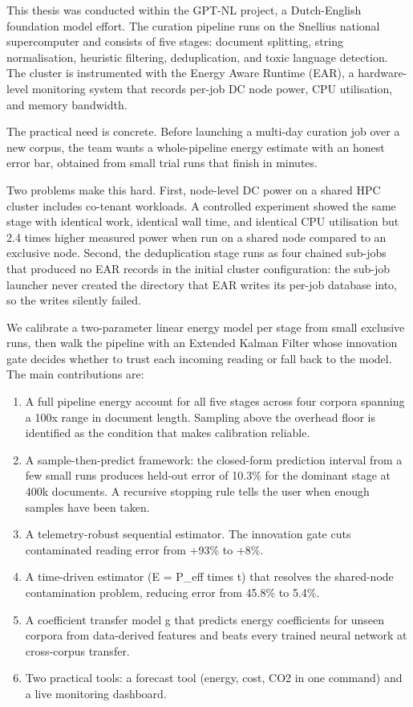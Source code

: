 \documentclass[12pt,a4paper]{article}
\begin{document}
This thesis was conducted within the GPT-NL project, a Dutch-English foundation model effort. The curation pipeline runs on the Snellius national supercomputer \cite{surf_snellius} and consists of five stages: document splitting, string normalisation, heuristic filtering, deduplication, and toxic language detection. The cluster is instrumented with the Energy Aware Runtime (EAR), a hardware-level monitoring system \cite{bsc_ear} that records per-job DC node power, CPU utilisation, and memory bandwidth.

The practical need is concrete. Before launching a multi-day curation job over a new corpus, the team wants a whole-pipeline energy estimate with an honest error bar, obtained from small trial runs that finish in minutes.

Two problems make this hard. First, node-level DC power on a shared HPC cluster includes co-tenant workloads. A controlled experiment showed the same stage with identical work, identical wall time, and identical CPU utilisation but 2.4 times higher measured power when run on a shared node compared to an exclusive node. Second, the deduplication stage runs as four chained sub-jobs that produced no EAR records in the initial cluster configuration: the sub-job launcher never created the directory that EAR writes its per-job database into, so the writes silently failed.

We calibrate a two-parameter linear energy model per stage from small exclusive runs, then walk the pipeline with an Extended Kalman Filter \cite{welch2006kalman,sarkka2013bayesian} whose innovation gate decides whether to trust each incoming reading or fall back to the model. The main contributions are:

\begin{enumerate}
  \item A full pipeline energy account for all five stages across four corpora spanning a 100x range in document length. Sampling above the overhead floor is identified as the condition that makes calibration reliable.
  \item A sample-then-predict framework: the closed-form prediction interval from a few small runs produces held-out error of 10.3\% for the dominant stage at 400k documents. A recursive stopping rule tells the user when enough samples have been taken.
  \item A telemetry-robust sequential estimator. The innovation gate cuts contaminated reading error from +93\% to +8\%.
  \item A time-driven estimator (E = P\_eff times t) that resolves the shared-node contamination problem, reducing error from 45.8\% to 5.4\%.
  \item A coefficient transfer model g that predicts energy coefficients for unseen corpora from data-derived features and beats every trained neural network at cross-corpus transfer.
  \item Two practical tools: a forecast tool (energy, cost, CO2 in one command) and a live monitoring dashboard.
\end{enumerate}
\end{document}
